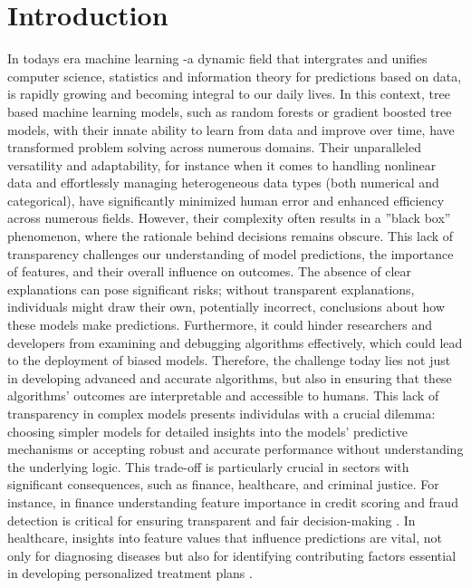 \documentclass[12pt]{article}
\begin{document}
\section{Introduction}
In todays era machine learning -a dynamic field that intergrates and unifies computer science, statistics and information theory for predictions based on data, is rapidly growing and becoming integral to our daily lives. %
In this context, tree based machine learning models, such as random forests or gradient boosted tree models, with their innate ability to learn from data and improve over time, have transformed problem solving across numerous domains.
Their unparalleled versatility and adaptability, for instance when it comes to handling nonlinear data and effortlessly managing heterogeneous data types (both numerical and categorical), have significantly minimized human error and enhanced efficiency across numerous fields. %
However, their complexity often results in a ”black box” phenomenon, where the rationale behind decisions remains obscure.
  This lack of transparency challenges our understanding of model predictions, the importance of features, and their overall influence on outcomes.
 The absence of clear explanations can pose significant risks; without transparent explanations, individuals might draw their own, potentially incorrect, conclusions about how these models make predictions. Furthermore, it could hinder researchers and developers from examining and debugging algorithms effectively, which could lead to the deployment of biased models.
Therefore, the challenge today lies not just in developing advanced and accurate algorithms, but also in ensuring that these algorithms' outcomes are interpretable and accessible to humans.
 This lack of transparency in complex models presents individulas with a crucial dilemma: choosing simpler models for detailed insights into the models’ predictive mechanisms or accepting robust and accurate performance without understanding the underlying logic. \cite{molnar2022}
This trade-off is particularly crucial in sectors with significant consequences, such as finance, healthcare, and criminal justice.
For instance, in finance understanding feature importance in credit scoring and fraud detection is critical for ensuring transparent and fair decision-making \cite{KVAMME2018207}.
 In healthcare, insights into feature values that influence predictions are vital, not only for diagnosing diseases but also for identifying contributing factors essential in developing personalized treatment plans \cite{Elish2020ASO}.
\end{document}
